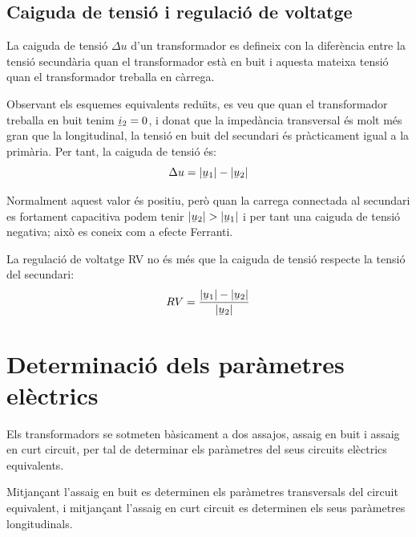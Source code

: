 \subsection{Caiguda de tensi\'{o} i regulaci\'{o} de voltatge}

La caiguda de tensi\'{o} $\Delta u$ d'un transformador  es defineix con la difer\`{e}ncia entre la tensi\'{o} secund\`{a}ria quan el transformador est\`{a} en buit i aquesta mateixa tensi\'{o} quan el transformador treballa en c\`{a}rrega.

Observant els esquemes equivalents redu\"{\i}ts, es veu que quan el transformador treballa en buit tenim $\cmplx{i}_2=0$, i donat que la imped\`{a}ncia transversal \'{e}s molt m\'{e}s gran que la longitudinal, la tensi\'{o} en buit del secundari \'{e}s pr\`{a}cticament igual a la prim\`{a}ria. Per tant, la caiguda de tensi\'{o} \'{e}s:
\begin{equation}
    \Delta u = |\cmplx{u}_1| - |\cmplx{u}_2|
\end{equation}

Normalment aquest valor \'{e}s positiu, per\`{o} quan la carrega connectada al secundari es fortament capacitiva podem tenir  $|\cmplx{u}_2| > |\cmplx{u}_1|$ i per tant una caiguda de tensi\'{o} negativa; aix\`{o} es coneix com a efecte Ferranti.

La regulaci\'{o} de voltatge RV no \'{e}s m\'{e}s que la caiguda de tensi\'{o} respecte la tensi\'{o} del secundari:
\begin{equation}
    RV = \frac{|\cmplx{u}_1| - |\cmplx{u}_2|}{|\cmplx{u}_2|}
\end{equation}

\section{Determinaci\'{o} dels par\`{a}metres el\`{e}ctrics}\label{sec:determ-param-trafo}

Els transformadors se sotmeten b\`{a}sicament a dos assajos, assaig en
buit i assaig en curt circuit, per tal de determinar els par\`{a}metres
del seus circuits el\`{e}ctrics equivalents.

Mitjan\c{c}ant l'assaig en buit es determinen els par\`{a}metres
transversals del circuit equivalent, i mitjan\c{c}ant l'assaig en curt
circuit es determinen els seus par\`{a}metres longitudinals.

